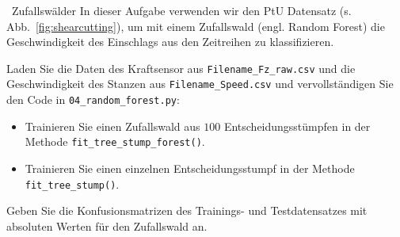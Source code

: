 \begin{task}[credit=4]{\codesym~Zufallswälder}
In dieser Aufgabe verwenden wir den PtU Datensatz (s. Abb.~\ref{fig:shearcutting}), um mit einem Zufallswald (engl. Random Forest) die Geschwindigkeit des Einschlags aus den Zeitreihen zu klassifizieren.
 
\begin{subtask}[points=2,title=\codesym~\texttt{04\_random\_forest.py}]
Laden Sie die Daten des Kraftsensor aus \texttt{Filename\_Fz\_raw.csv} und die Geschwindigkeit des Stanzen aus \texttt{Filename\_Speed.csv} und vervollständigen Sie den Code in \texttt{04\_random\_forest.py}:

\begin{itemize}
\item[\codesym] Trainieren Sie einen Zufallswald aus $100$ Entscheidungsstümpfen in der Methode \texttt{fit\_tree\_stump\_forest()}.

\item[\codesym] Trainieren Sie einen einzelnen Entscheidungsstumpf in der Methode \texttt{fit\_tree\_stump()}.
\end{itemize}
\end{subtask}

\begin{subtask}[title=Konfusionsmatrix,points=2]
Geben Sie die Konfusionsmatrizen des Trainings- und Testdatensatzes mit absoluten Werten für den Zufallswald  an.

\begin{solution}
\end{solution}

\end{subtask}

\end{task}
